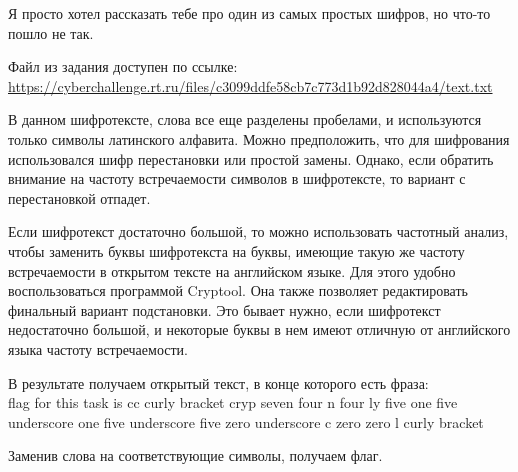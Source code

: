 
Я просто хотел рассказать тебе про один из самых простых шифров, но что-то пошло не так.

Файл из задания доступен по ссылке: \url{https://cyberchallenge.rt.ru/files/c3099ddfe58cb7c773d1b92d828044a4/text.txt}

\solutionSection

В данном шифротексте, слова все еще разделены пробелами, и используются только символы латинского алфавита. Можно предположить, что для шифрования использовался шифр перестановки или простой замены. Однако, если обратить внимание на частоту встречаемости символов в шифротексте, то вариант с перестановкой отпадет.

Если шифротекст достаточно большой, то можно использовать частотный анализ, чтобы заменить буквы шифротекста на буквы, имеющие такую же частоту встречаемости в открытом тексте на английском языке.  Для этого удобно воспользоваться программой Cryptool. Она также позволяет редактировать финальный вариант подстановки. Это бывает нужно, если шифротекст недостаточно большой, и некоторые буквы в нем имеют отличную от английского языка частоту встречаемости. 


В результате получаем открытый текст, в конце которого есть фраза:\\
flag for this task is cc curly bracket cryp seven four n four ly five one five underscore one five underscore five zero underscore c zero zero l curly bracket

Заменив слова на соответствующие символы, получаем флаг.

